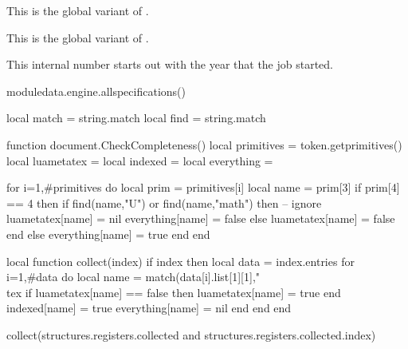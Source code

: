 \startnewprimitive[title={\prm {xtoksapp}}]

This is the global variant of .

\stopnewprimitive

\startnewprimitive[title={\prm {xtokspre}}]

This is the global variant of .

\stopnewprimitive

\startoldprimitive[title={\prm {year}}]

This internal number starts out with the year that the job started.

\stopoldprimitive

\stopsection

\page

\startsection[title=Syntax]

\startpagecolumns[page=no]
    \startluacode
        moduledata.engine.allspecifications()
    \stopluacode
\stoppagecolumns

\stopsection

\page

\startluacode
    local match = string.match
    local find  = string.match

    function document.CheckCompleteness()
        local primitives = token.getprimitives()
        local luametatex = { }
        local indexed    = { }
        local everything = { }

        for i=1,#primitives do
            local prim = primitives[i]
            local name = prim[3]
            if prim[4] == 4 then
                if find(name,"U") or find(name,"math") then
                    -- ignore
                    luametatex[name] = nil
                    everything[name] = false
                else
                    luametatex[name] = false
                end
            else
                everything[name] = true
            end
        end

        local function collect(index)
            if index then
                local data = index.entries
                for i=1,#data do
                    local name = match(data[i].list[1][1],"\\tex%
                    if luametatex[name] == false then
                        luametatex[name] = true
                    end
                    indexed[name] = true
                    everything[name] = nil
                end
            end
        end

        collect(structures.registers.collected and structures.registers.collected.index)

